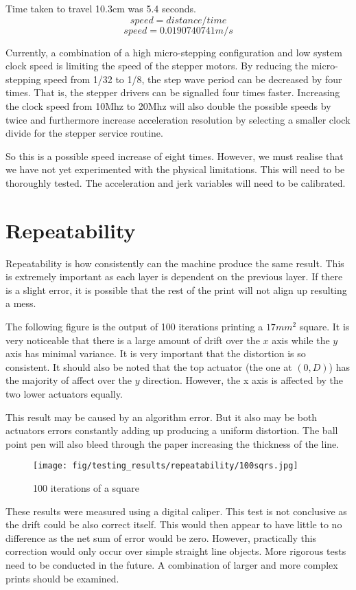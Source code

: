 \documentclass[a4paper, 11pt, twoside]{Thesis}  %
\begin{document}
Time taken to travel 10.3cm was 5.4 seconds.
$$ speed = distance  / time $$
$$ speed = 0.0190740741 m/s $$


Currently, a combination of a high micro-stepping configuration and low system clock speed is limiting the speed of the stepper motors. By reducing the micro-stepping speed from 1/32 to 1/8, the step wave period can be decreased by four times. That is, the stepper drivers can be signalled four times faster. Increasing the clock speed from 10Mhz to 20Mhz will also double the possible speeds by twice and furthermore increase acceleration resolution by selecting a smaller clock divide for the stepper service routine.

So this is a possible speed increase of eight times. However, we must realise that we have not yet experimented with the physical limitations. This will need to be thoroughly tested. The acceleration and jerk variables will need to be calibrated.
\section{Repeatability}

Repeatability is how consistently can the machine produce the same result. This is extremely important as each layer is dependent on the previous layer. If there is a slight error, it is possible that the rest of the print will not align up resulting a mess.

The following figure is the output of 100 iterations printing a $17mm^2$ square. It is very noticeable that there is a large amount of drift over the $x$ axis while the $y$ axis has minimal variance. It is very important that the distortion is so consistent. It should also be noted that the top actuator (the one at $(0,D)$) has the majority of affect over the $y$ direction. However, the x axis is affected by the two lower actuators equally.

This result may be caused by an algorithm error. But it also may be both actuators errors constantly adding up producing a uniform distortion. The ball point pen will also bleed through the paper increasing the thickness of the line.

\begin{figure}[H]
\centering%
\texttt{[image: fig/testing\_results/repeatability/100sqrs.jpg]}
\caption{100 iterations of a square}
\label{fig:100sqrs.jpg}
\end{figure}

These results were measured using a digital caliper. This test is not conclusive as the drift could be also correct itself. This would then appear to have little to no difference as the net sum of error would be zero. However, practically this correction would only occur over simple straight line objects. More rigorous tests need to be conducted in the future. A combination of larger and more complex prints should be examined.
\end{document}
